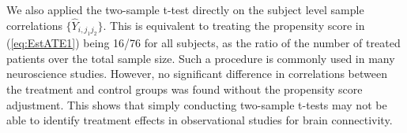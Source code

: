 \documentclass[12pt]{article}
\theoremstyle{definition}
\begin{document}
We also applied the two-sample t-test directly on the subject level sample correlations $\{\hat{Y}_{i, j_1j_2}\}$. 
This is equivalent to treating the propensity score in (\ref{eq:EstATE1}) being 16/76 for all subjects, as the ratio of the number of treated patients over the total sample size. 
Such a procedure is commonly used in many neuroscience studies.
However, no significant difference in correlations between the treatment and control groups was found without the propensity score adjustment. This shows that simply conducting two-sample t-tests may not be able to identify treatment effects in observational studies for brain connectivity.

 
\end{document}
